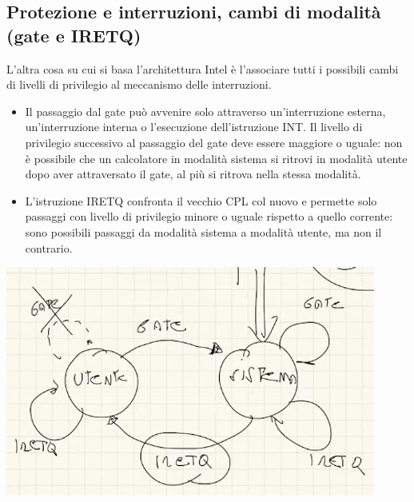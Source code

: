 \subsection{Protezione e interruzioni, cambi di modalità (gate e IRETQ)} L'altra cosa su cui si basa l'architettura Intel è l'associare tutti i possibili cambi di livelli di privilegio al meccanismo delle interruzioni.
\begin{itemize}
	\item Il passaggio dal gate può avvenire solo attraverso un'interruzione esterna, un'interruzione interna o l'esecuzione dell'istruzione INT. Il livello di privilegio successivo al passaggio del gate deve essere maggiore o uguale: non è possibile che un calcolatore in modalità sistema si ritrovi in modalità utente dopo aver attraversato il gate, al più si ritrova nella stessa modalità. 
	\item L'istruzione IRETQ confronta il vecchio CPL col nuovo e permette solo passaggi con livello di privilegio minore o uguale rispetto a quello corrente: sono possibili passaggi da modalità sistema a modalità utente, ma non il contrario. 
\end{itemize}
\begin{center}\includegraphics[scale=.75]{img/120.PNG}\end{center}

